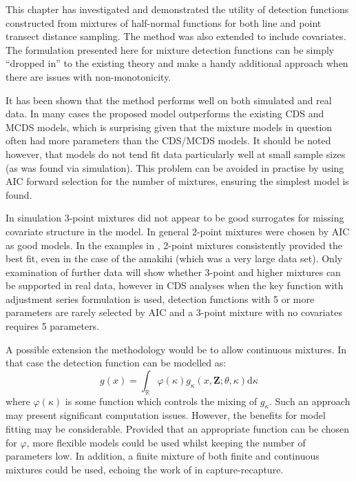 This chapter has investigated and demonstrated the utility of detection functions constructed from mixtures of half-normal functions for both line and point transect distance sampling. The method was also extended to include covariates. The formulation presented here for mixture detection functions can be simply ``dropped in'' to the existing theory and make a handy additional approach when there are issues with non-monotonicity.

It has been shown that the method performs well on both simulated and real data. In many cases the proposed model outperforms the existing CDS and MCDS models, which is surprising given that the mixture models in question often had more parameters than the CDS/MCDS models. It should be noted however, that models do not tend fit data particularly well at small sample sizes (as was found via simulation). This problem can be avoided in practise by using AIC forward selection for the number of mixtures, ensuring the simplest model is found.

In simulation 3-point mixtures did not appear to be good surrogates for missing covariate structure in the model. In general 2-point mixtures were chosen by AIC as good models. In the examples in , 2-point mixtures consistently provided the best fit, even in the case of the amakihi (which was a very large data set). Only examination of further data will show whether 3-point and higher mixtures can be supported in real data, however in CDS analyses when the key function with adjustment series formulation is used, detection functions with 5 or more parameters are rarely selected by AIC and a 3-point mixture with no covariates requires 5 parameters.

A possible extension the methodology would be to allow continuous mixtures. In that case the detection function can be modelled as:
\begin{equation*}
g(x) = \int_\mathbb{R} \varphi(\kappa) g_\kappa(x,\mathbf{Z}; \theta, \kappa) \text{d}\kappa
\end{equation*}
where $\varphi(\kappa)$ is some function which controls the mixing of $g_\kappa$. Such an approach may present significant computation issues. However, the benefits for model fitting may be considerable. Provided that an appropriate function can be chosen for $\varphi$, more flexible models could be used whilst keeping the number of parameters low. In addition, a finite mixture of both finite and continuous mixtures could be used, echoing the work of  in capture-recapture.


